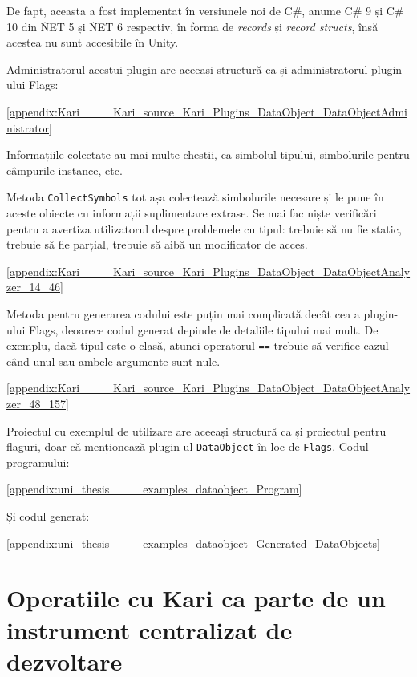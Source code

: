\documentclass[a4paper,12pt]{report}
\begin{document}
De fapt, aceasta a fost implementat în versiunele noi de C\#, anume C\# 9 și C\# 10 din \. NET 5 și \. NET 6 respectiv, în forma de \emph{records} și \emph{record structs}, însă acestea nu sunt accesibile în Unity.\cite{records_in_csharp}

Administratorul acestui plugin are aceeași structură ca și administratorul plugin-ului Flags:

\ref{appendix:Kari____Kari_source_Kari_Plugins_DataObject_DataObjectAdministrator}

Informațiile colectate au mai multe chestii, ca simbolul tipului, simbolurile pentru câmpurile instance, etc.



Metoda \texttt{CollectSymbols} tot așa colectează simbolurile necesare și le pune în aceste obiecte cu informații suplimentare extrase.
Se mai fac niște verificări pentru a avertiza utilizatorul despre problemele cu tipul: trebuie să nu fie static, trebuie să fie parțial, trebuie să aibă un modificator de acces.

\ref{appendix:Kari____Kari_source_Kari_Plugins_DataObject_DataObjectAnalyzer_14_46}

Metoda pentru generarea codului este puțin mai complicată decât cea a plugin-ului Flags, deoarece codul generat depinde de detaliile tipului mai mult.
De exemplu, dacă tipul este o clasă, atunci operatorul \texttt{==} trebuie să verifice cazul când unul sau ambele argumente sunt nule. 

\ref{appendix:Kari____Kari_source_Kari_Plugins_DataObject_DataObjectAnalyzer_48_157}

Proiectul cu exemplul de utilizare are aceeași structură ca și proiectul pentru flaguri, doar că menționează plugin-ul \texttt{DataObject} în loc de \texttt{Flags}.
Codul programului:

\ref{appendix:uni_thesis____examples_dataobject_Program}

Și codul generat:

\ref{appendix:uni_thesis____examples_dataobject_Generated_DataObjects}



\section{Operatiile cu Kari ca parte de un instrument centralizat de dezvoltare}
\end{document}
